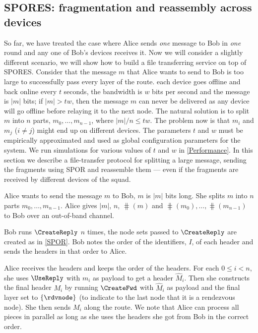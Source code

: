\subsection{\acs{SPORES}: fragmentation and reassembly across devices}%
\label{SPORES}%
\label{sec:file_transfer}

So far, we have treated the case where Alice sends \emph{one} message to Bob in 
\emph{one} round and any one of Bob's devices receives it.
Now we will consider a slightly different scenario, we will show how to build a 
file transferring service on top of \ac{SPORES}.
Consider that the message \(m\) that Alice wants to send to Bob is too large to 
successfully pass every layer of the route.
\Eg each device goes offline and back online every \(t\) seconds, the bandwidth 
is \(w\) bits per second and the message is \(|m|\) bits; if \(|m| > t w\), 
then the message \(m\) can never be delivered as any device will go offline 
before relaying it to the next node.
The natural solution is to split \(m\) into \(n\) parts, \(m_0, \dotsc, 
  m_{n-1}\), where \(|m|/n\leq t w\).
The problem now is that \(m_i\) and \(m_j\) (\(i\neq j\)) might end up on 
different devices.
The parameters \(t\) and \(w\) must be empirically approximated and used as 
global configuration parameters for the system.
We run simulations for various values of \(t\) and \(w\) in \cref{Performance}.
In this section we describe a file-transfer protocol for splitting a large 
message, sending the fragments using \ac{SPOR} and reassemble them --- even if 
the fragments are received by different devices of the squad.

Alice wants to send the message \(m\) to Bob, \(m\) is \(|m|\) bits long.
She splits \(m\) into \(n\) parts \(m_0, \dotsc, m_{n-1}\).
Alice gives \(|m|\), \(n\), \(\hash(m)\) and \(\hash(m_0), \dotsc, 
  \hash(m_{n-1})\) to Bob over an out-of-band channel.

Bob runs \(\CreateReply\) \(n\) times, the node sets passed to \(\CreateReply\) 
are created as in \cref{SPOR}.
Bob notes the order of the identifiers, \(I\), of each header and sends the 
headers in that order to Alice.

Alice receives the headers and keeps the order of the headers.
For each \(0\leq i < n\), she uses \(\UseReply\) with \(m_i\) as payload to get 
a header \(\hat M_i\).
Then she constructs the final header \(M_i\) by running \(\CreateFwd\) with 
\(\hat M_i\) as payload and the final layer set to \(\{\rdvnode\}\) (to 
indicate to the last node that it is a rendezvous node).
She then sends \(M_i\) along the route.
We note that Alice can process all pieces in parallel as long as she uses the 
headers she got from Bob in the correct order.

